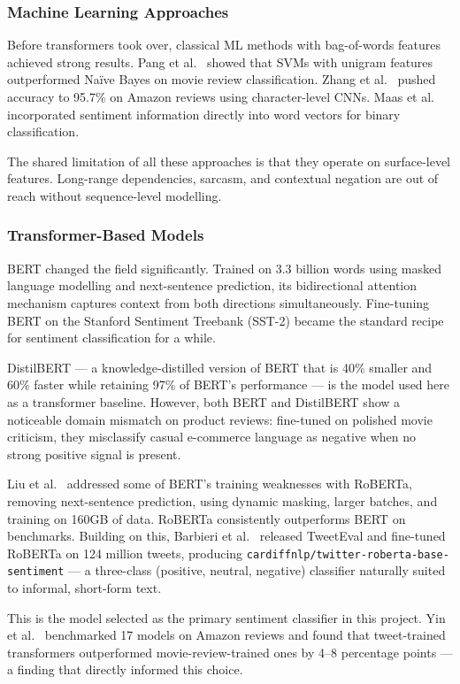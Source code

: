 \subsubsection{Machine Learning Approaches}
\begin{justify}
Before transformers took over, classical ML methods with bag-of-words features achieved strong results. Pang et al.\ \cite{pang2002thumbs} showed that SVMs with unigram features outperformed Naïve Bayes on movie review classification. Zhang et al.\ \cite{zhang2015character} pushed accuracy to 95.7\% on Amazon reviews using character-level CNNs. Maas et al.\ \cite{maas2011learning} incorporated sentiment information directly into word vectors for binary classification.

The shared limitation of all these approaches is that they operate on surface-level features. Long-range dependencies, sarcasm, and contextual negation are out of reach without sequence-level modelling.
\end{justify}

\subsubsection{Transformer-Based Models}
\begin{justify}
BERT \cite{devlin2019bert} changed the field significantly. Trained on 3.3 billion words using masked language modelling and next-sentence prediction, its bidirectional attention mechanism captures context from both directions simultaneously. Fine-tuning BERT on the Stanford Sentiment Treebank (SST-2) \cite{socher2013recursive} became the standard recipe for sentiment classification for a while.

DistilBERT \cite{sanh2019distilbert} — a knowledge-distilled version of BERT that is 40\% smaller and 60\% faster while retaining 97\% of BERT's performance — is the model used here as a transformer baseline. However, both BERT and DistilBERT show a noticeable domain mismatch on product reviews: fine-tuned on polished movie criticism, they misclassify casual e-commerce language as negative when no strong positive signal is present.

Liu et al.\ \cite{liu2019roberta} addressed some of BERT's training weaknesses with RoBERTa, removing next-sentence prediction, using dynamic masking, larger batches, and training on 160GB of data. RoBERTa consistently outperforms BERT on benchmarks. Building on this, Barbieri et al.\ \cite{barbieri2020tweeteval} released TweetEval and fine-tuned RoBERTa on 124 million tweets, producing \texttt{cardiffnlp/twitter-roberta-base-sentiment} — a three-class (positive, neutral, negative) classifier naturally suited to informal, short-form text.

This is the model selected as the primary sentiment classifier in this project. Yin et al.\ \cite{yin2020benchmarking} benchmarked 17 models on Amazon reviews and found that tweet-trained transformers outperformed movie-review-trained ones by 4--8 percentage points — a finding that directly informed this choice.
\end{justify}

